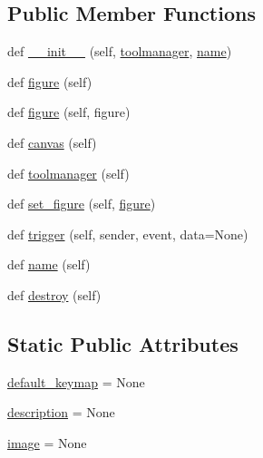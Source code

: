\subsection*{Public Member Functions}
\begin{DoxyCompactItemize}
\item 
def \hyperlink{classmatplotlib_1_1backend__tools_1_1ToolBase_ad220305a96c5635531913147ba548ca3}{\+\_\+\+\_\+init\+\_\+\+\_\+} (self, \hyperlink{classmatplotlib_1_1backend__tools_1_1ToolBase_aa7888dab7ba0552f93037f1df4b192f6}{toolmanager}, \hyperlink{classmatplotlib_1_1backend__tools_1_1ToolBase_a1d36209f79c4ef48cd4bf27a70725f51}{name})
\item 
def \hyperlink{classmatplotlib_1_1backend__tools_1_1ToolBase_af85e83d1db0787aa40d06837204651ee}{figure} (self)
\item 
def \hyperlink{classmatplotlib_1_1backend__tools_1_1ToolBase_a713e936fba2aef09af69e7cfe8eacf85}{figure} (self, figure)
\item 
def \hyperlink{classmatplotlib_1_1backend__tools_1_1ToolBase_ac96bf482f1c26012fec3fd575e849170}{canvas} (self)
\item 
def \hyperlink{classmatplotlib_1_1backend__tools_1_1ToolBase_aa7888dab7ba0552f93037f1df4b192f6}{toolmanager} (self)
\item 
def \hyperlink{classmatplotlib_1_1backend__tools_1_1ToolBase_aa871e39862d028c704279af0f9f3fb5b}{set\+\_\+figure} (self, \hyperlink{classmatplotlib_1_1backend__tools_1_1ToolBase_af85e83d1db0787aa40d06837204651ee}{figure})
\item 
def \hyperlink{classmatplotlib_1_1backend__tools_1_1ToolBase_a789005a8a3c42ec7b0d5a31a9e7e12ae}{trigger} (self, sender, event, data=None)
\item 
def \hyperlink{classmatplotlib_1_1backend__tools_1_1ToolBase_a1d36209f79c4ef48cd4bf27a70725f51}{name} (self)
\item 
def \hyperlink{classmatplotlib_1_1backend__tools_1_1ToolBase_aa43bb065c57c164cf457d9d46765ca96}{destroy} (self)
\end{DoxyCompactItemize}
\subsection*{Static Public Attributes}
\begin{DoxyCompactItemize}
\item 
\hyperlink{classmatplotlib_1_1backend__tools_1_1ToolBase_a8e12b0ed7ee376740ae47329706329f9}{default\+\_\+keymap} = None
\item 
\hyperlink{classmatplotlib_1_1backend__tools_1_1ToolBase_ac110aeab1e632d73815dc49a7cfc82c8}{description} = None
\item 
\hyperlink{classmatplotlib_1_1backend__tools_1_1ToolBase_a1bed4c4ed1281b3fdc331850a5247f75}{image} = None
\end{DoxyCompactItemize}


